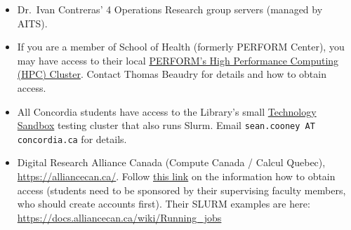 \begin{itemize}
    \item
    Dr.~Ivan Contreras' 4 Operations Research group servers (managed by AITS).

    \item
    If you are a member of School of Health (formerly PERFORM Center),
    you may have access to their local
    \href{https://perform-wiki.concordia.ca/mediawiki/index.php/HPC_Cluster}{PERFORM's High Performance Computing (HPC) Cluster}.
    Contact Thomas Beaudry for details and how to obtain access.

    \item
    All Concordia students have access to the Library's small
    \href{https://library.concordia.ca/technology/sandbox/}{Technology Sandbox}
    testing cluster that also runs Slurm. Email \texttt{sean.cooney AT concordia.ca} for details.

    \item
    Digital Research Alliance Canada (Compute Canada / Calcul Quebec),\\
    \url{https://alliancecan.ca/}. Follow
    \href{https://www.alliancecan.ca/en/our-services/advanced-research-computing/account-management/apply-account}{this link}
    on the information how to obtain access (students need to be sponsored
    by their supervising faculty members, who should create accounts first).
    Their SLURM examples are here: \url{https://docs.alliancecan.ca/wiki/Running_jobs}

\end{itemize}
